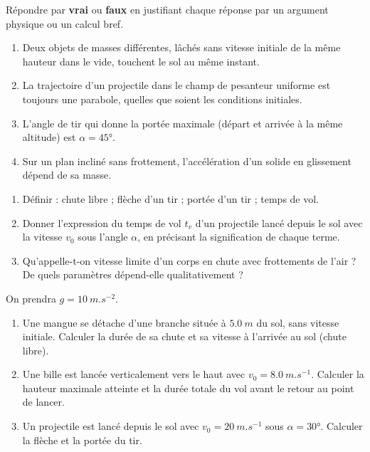 \documentclass[11pt]{article}
\newcommand{\cle}[1]{{\popxbold\color{popdark}#1}}
\begin{document}
\begin{exercice}
Répondre par \textbf{vrai} ou \textbf{faux} en justifiant chaque réponse par un argument physique ou un calcul bref.
\begin{enumerate}
\item Deux objets de masses différentes, lâchés sans vitesse initiale de la même hauteur dans le vide, touchent le sol au même instant.
\item La trajectoire d'un projectile dans le champ de pesanteur uniforme est toujours une parabole, quelles que soient les conditions initiales.
\item L'angle de tir qui donne la portée maximale (départ et arrivée à la même altitude) est $\alpha = 45°$.
\item Sur un plan incliné sans frottement, l'accélération d'un solide en glissement dépend de sa masse.
\end{enumerate}
\end{exercice}

\begin{exercice}
\begin{enumerate}
\item Définir : chute libre ; flèche d'un tir ; portée d'un tir ; temps de vol.
\item Donner l'expression du temps de vol $t_v$ d'un projectile lancé depuis le sol avec la vitesse $v_0$ sous l'angle $\alpha$, en précisant la signification de chaque terme.
\item Qu'appelle-t-on \cle{vitesse limite} d'un corps en chute avec frottements de l'air ? De quels paramètres dépend-elle qualitativement ?
\end{enumerate}
\end{exercice}

\begin{exercice}
On prendra $g = \SI{10}{m.s^{-2}}$.
\begin{enumerate}
\item Une mangue se détache d'une branche située à $\SI{5,0}{m}$ du sol, sans vitesse initiale. Calculer la durée de sa chute et sa vitesse à l'arrivée au sol (chute libre).
\item Une bille est lancée verticalement vers le haut avec $v_0 = \SI{8,0}{m.s^{-1}}$. Calculer la hauteur maximale atteinte et la durée totale du vol avant le retour au point de lancer.
\item Un projectile est lancé depuis le sol avec $v_0 = \SI{20}{m.s^{-1}}$ sous $\alpha = 30°$. Calculer la flèche et la portée du tir.
\end{enumerate}
\end{exercice}
\end{document}
